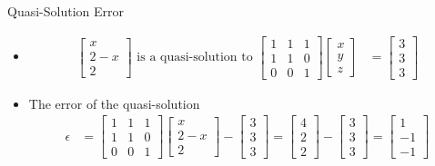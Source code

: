 \documentclass[usenames,dvipsnames,10pt]{beamer}
\begin{document}
\begin{frame}
  {Quasi-Solution Error}

  \begin{itemize}
  \item 
    \begin{align*}
      \begin{bmatrix} x \\ 2-x \\ 2 \end{bmatrix}\text{ is a quasi-solution to }
      \begin{bmatrix} 1 & 1 & 1 \\ 1 & 1 & 0 \\ 0 & 0 & 1\end{bmatrix}\begin{bmatrix} x \\ y \\ z \end{bmatrix} &= \begin{bmatrix} 3 \\ 3 \\ 3 \end{bmatrix}
    \end{align*}
  \item The error of the quasi-solution
    \begin{align*}
      \epsilon &= \begin{bmatrix} 1 & 1 & 1 \\ 1 & 1 & 0 \\ 0 & 0 & 1\end{bmatrix}\begin{bmatrix} x \\ 2-x \\ 2 \end{bmatrix}
                 -\begin{bmatrix} 3 \\ 3 \\ 3 \end{bmatrix}
                 = \begin{bmatrix} 4 \\ 2 \\ 2 \end{bmatrix} - \begin{bmatrix} 3 \\ 3 \\ 3 \end{bmatrix}
                 = \begin{bmatrix} 1 \\ -1 \\ -1 \end{bmatrix} 
    \end{align*}
  \end{itemize}
\end{frame}
\end{document}
